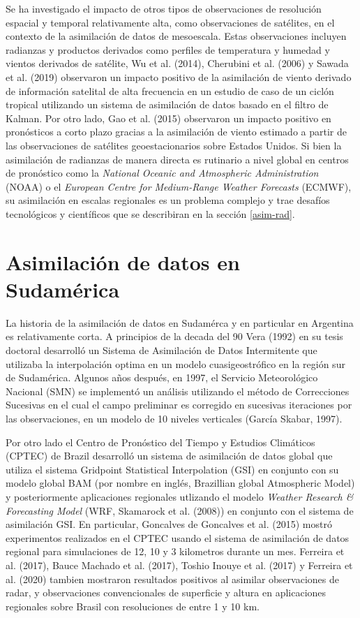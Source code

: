 \documentclass[12pt,oneside,a4paper]{reedthesis}
\begin{document}
Se ha investigado el impacto de otros tipos de observaciones de resolución espacial y temporal relativamente alta, como observaciones de satélites, en el contexto de la asimilación de datos de mesoescala. Estas observaciones incluyen radianzas y productos derivados como perfiles de temperatura y humedad y vientos derivados de satélite, Wu et al. (2014), Cherubini et al. (2006) y Sawada et al. (2019) observaron un impacto positivo de la asimilación de viento derivado de información satelital de alta frecuencia en un estudio de caso de un ciclón tropical utilizando un sistema de asimilación de datos basado en el filtro de Kalman. Por otro lado, Gao et al. (2015) observaron un impacto positivo en pronósticos a corto plazo gracias a la asimilación de viento estimado a partir de las observaciones de satélites geoestacionarios sobre Estados Unidos. Si bien la asimilación de radianzas de manera directa es rutinario a nivel global en centros de pronóstico como la \emph{National Oceanic and Atmospheric Administration} (NOAA) o el \emph{European Centre for Medium-Range Weather Forecasts} (ECMWF), su asimilación en escalas regionales es un problema complejo y trae desafíos tecnológicos y científicos que se describiran en la sección \ref{asim-rad}.

\hypertarget{asimilaciuxf3n-de-datos-en-sudamuxe9rica}{%
\section{Asimilación de datos en Sudamérica}\label{asimilaciuxf3n-de-datos-en-sudamuxe9rica}}

La historia de la asimilación de datos en Sudamérca y en particular en Argentina es relativamente corta. A principios de la decada del 90 Vera (1992) en su tesis doctoral desarrolló un Sistema de Asimilación de Datos Intermitente que utilizaba la interpolación optima en un modelo cuasigeostrófico en la región sur de Sudamérica. Algunos años después, en 1997, el Servicio Meteorológico Nacional (SMN) se implementó un
análisis utilizando el método de Correcciones Sucesivas en el cual el campo preliminar
es corregido en sucesivas iteraciones por las observaciones, en un modelo de 10 niveles verticales (García Skabar, 1997).

Por otro lado el Centro de Pronóstico del Tiempo y Estudios Climáticos (CPTEC) de Brazil desarrolló un sistema de asimilación de datos global que utiliza el sistema Gridpoint Statistical Interpolation (GSI) en conjunto con su modelo global BAM (por nombre en inglés, Brazillian global Atmospheric Model) y posteriormente aplicaciones regionales utlizando el modelo \emph{Weather Research \& Forecasting Model} (WRF, Skamarock et al. (2008)) en conjunto con el sistema de asimilación GSI. En particular, Goncalves de Goncalves et al. (2015) mostró experimentos realizados en el CPTEC usando el sistema de asimilación de datos regional para simulaciones de 12, 10 y 3 kilometros durante un mes. Ferreira et al. (2017), Bauce Machado et al. (2017), Toshio Inouye et al. (2017) y Ferreira et al. (2020) tambien mostraron resultados positivos al asimilar observaciones de radar, y observaciones convencionales de superficie y altura en aplicaciones regionales sobre Brasil con resoluciones de entre 1 y 10 km.
\end{document}
